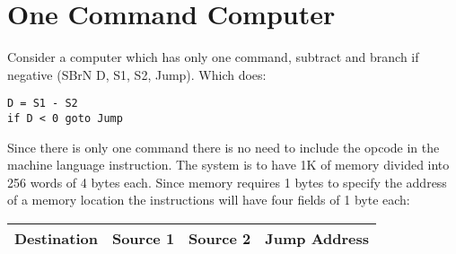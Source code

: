 \section{One Command Computer}

Consider a computer which has only one command, subtract and branch if negative (SBrN D, S1, S2, Jump).  Which does:

\begin{verbatim}
D = S1 - S2
if D < 0 goto Jump
\end{verbatim}

Since there is only one command there is no need to include the opcode in the machine language instruction.  The system is to have 1K of memory divided into 256 words of 4 bytes each.  Since memory requires 1 bytes to specify the address of a memory location the instructions will have four fields of 1 byte each:

\begin{tabular}{|c|c|c|c|} \hline
Destination & Source 1 & Source 2 & Jump Address \\ \hline
\end{tabular}

